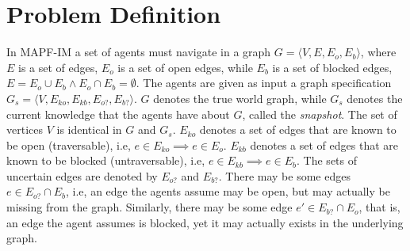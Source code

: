 \documentclass[letterpaper]{article} %
\def\
UrlFont{\rm}  %
\newcommand{\eo}{E_{o}} %
\newcommand{\eb}{E_{b}} %
\newcommand{\eko}{E_{ko}} %
\newcommand{\ekb}{E_{kb}} %
\newcommand{\eao}{E_{o?}} %
\newcommand{\eab}{E_{b?}} %
\theoremstyle{definition}
\begin{document}
\section{Problem Definition}


In MAPF-IM a set of agents must navigate in a graph $G=\langle V, E, \eo, \eb \rangle$, where $E$ is a set of edges, $\eo$ is a set of open edges, while $\eb$ is a set of blocked edges, $E=\eo \cup \eb \land \eo \cap \eb = \emptyset$. The agents are given as input a graph specification $G_s=\langle V, \eko, \ekb, \eao, \eab \rangle$. $G$ denotes the true world graph, while $G_s$ denotes the current knowledge that the agents have about $G$, called the {\em snapshot}. The set of vertices $V$ is identical in $G$ and $G_s$. $\eko$ denotes a set of edges that are known to be open (traversable), i.e, $ e \in \eko \implies e \in \eo$. $\ekb$ denotes a set of edges that are known to be blocked (untraversable), i.e, $e \in \ekb \implies e \in \eb$.
The sets of uncertain edges are denoted by $\eao$ and $\eab$. There may be some edges $e\in \eao \cap \eb$, i.e, an edge the agents assume may be open, but may actually be missing from the graph. Similarly, there may be some edge $e' \in \eab \cap \eo$, that is, an edge the agent assumes is blocked, yet it may actually exists in the underlying graph.
\end{document}
